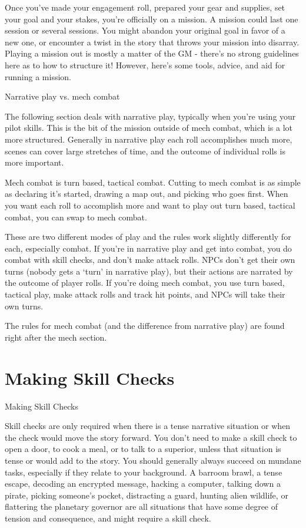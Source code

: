 Once you’ve made your engagement roll, prepared your gear and supplies, set your goal and
your stakes, you’re officially on a mission. A mission could last one session or several sessions.
You might abandon your original goal in favor of a new one, or encounter a twist in the story that
throws your mission into disarray. Playing a mission out is mostly a matter of the GM - there’s no
strong guidelines here as to how to structure it! However, here’s some tools, advice, and aid for
running a mission.

                                      Narrative play vs. mech combat

The following section deals with narrative play, typically when you’re using your pilot skills. This
is the bit of the mission outside of mech combat, which is a lot more structured. Generally in
narrative play each roll accomplishes much more, scenes can cover large stretches of time, and
the outcome of individual rolls is more important.

Mech combat is turn based, tactical combat. Cutting to mech combat is as simple as declaring
it’s started, drawing a map out, and picking who goes first. When you want each roll to accomplish
more and want to play out turn based, tactical combat, you can swap to mech combat.

These are two different modes of play and the rules work slightly differently for each, especially
combat. If you’re in narrative play and get into combat, you do combat with skill checks, and don’t
make attack rolls. NPCs don’t get their own turns (nobody gets a ‘turn’ in narrative play), but their
actions are narrated by the outcome of player rolls. If you’re doing mech combat, you use turn
based, tactical play, make attack rolls and track hit points, and NPCs will take their own turns.

The rules for mech combat (and the difference from narrative play) are found right after the mech
section.

\section{Making Skill Checks}
                                          Making Skill Checks

Skill checks are only required when there is a tense narrative situation or when the check
would move the story forward. You don’t need to make a skill check to open a door, to cook a
meal, or to talk to a superior, unless that situation is tense or would add to the story. You should
generally always succeed on mundane tasks, especially if they relate to your background. A
barroom brawl, a tense escape, decoding an encrypted message, hacking a computer, talking
down a pirate, picking someone’s pocket, distracting a guard, hunting alien wildlife, or flattering
the planetary governor are all situations that have some degree of tension and consequence, and
might require a skill check.


